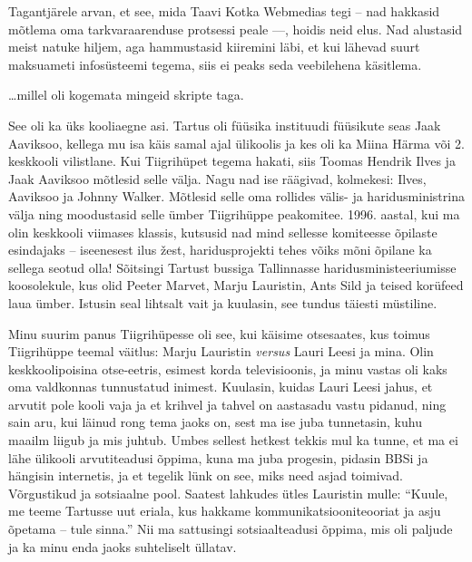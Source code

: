 Tagantjärele arvan, et see, mida Taavi Kotka 
Webmedias tegi -- nad hakkasid 
mõtlema oma tarkvaraarenduse protsessi peale ---, hoidis neid elus. 
Nad alustasid meist natuke hiljem, aga hammustasid kiiremini läbi, et kui 
lähevad suurt maksuameti infosüsteemi tegema, siis ei peaks seda veebilehena 
käsitlema. 


\ldots millel oli kogemata mingeid skripte taga.


See oli ka üks kooliaegne asi. Tartus oli füüsika 
instituudi füüsikute seas Jaak 
Aaviksoo, kellega mu isa käis samal ajal 
ülikoolis ja kes oli ka Miina Härma või 
2. keskkooli vilistlane. Kui Tiigrihüpet tegema hakati, siis Toomas Hendrik 
Ilves ja Jaak Aaviksoo mõtlesid selle välja. Nagu nad ise räägivad, kolmekesi: Ilves, Aaviksoo 
ja Johnny Walker. Mõtlesid selle oma rollides välis- ja 
haridusministrina välja ning moodustasid selle ümber Tiigrihüppe peakomitee. 
1996. aastal, kui ma olin keskkooli viimases klassis, kutsusid nad mind sellesse 
komiteesse õpilaste esindajaks -- iseenesest ilus žest, 
haridusprojekti tehes võiks mõni õpilane ka sellega seotud olla! Sõitsingi Tartust bussiga Tallinnasse haridusministeeriumisse 
koosolekule, kus olid Peeter Marvet, Marju 
Lauristin, Ants Sild ja 
teised korüfeed laua ümber. Istusin seal 
lihtsalt vait ja kuulasin, see tundus täiesti müstiline. 

Minu suurim panus Tiigrihüpesse oli see, kui käisime otsesaates, kus toimus Tiigrihüppe 
teemal väitlus: Marju Lauristin \emph{versus} 
Lauri Leesi ja mina. Olin keskkoolipoisina otse-eetris, esimest korda 
televisioonis, ja minu vastas oli kaks oma 
valdkonnas tunnustatud inimest. Kuulasin, kuidas Lauri Leesi 
jahus, et arvutit pole kooli vaja ja et krihvel ja tahvel 
on aastasadu vastu pidanud, ning sain aru, kui läinud rong tema
jaoks on, sest ma ise juba tunnetasin, kuhu maailm liigub ja mis juhtub. Umbes sellest hetkest tekkis mul ka tunne, 
et ma ei lähe ülikooli arvutiteadusi õppima, kuna ma juba progesin, pidasin
BBSi ja hängisin internetis, ja et tegelik lünk on see, miks need 
asjad toimivad. Võrgustikud ja sotsiaalne pool. Saatest lahkudes ütles Lauristin mulle: \enquote{Kuule, me teeme 
Tartusse uut eriala, kus hakkame kommunikatsiooniteooriat ja asju õpetama -- 
tule sinna.} Nii ma sattusingi sotsiaalteadusi õppima, mis 
oli paljude ja ka minu enda jaoks suhteliselt üllatav.

